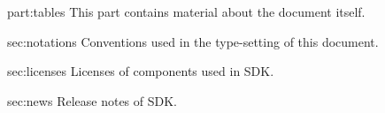 \begin{partDescription}{part:tables}
  {
    This part contains material about the document itself.
  }
\item[sec:notations]
  Conventions used in the type-setting of this document.

\item[sec:licenses]
  Licenses of components used in \urbi SDK.

\item[sec:news]
  Release notes of \urbi SDK.

\end{partDescription}


